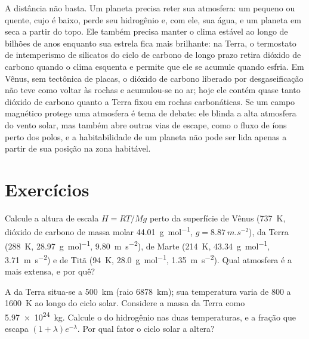 A distância não basta. Um planeta precisa reter sua atmosfera: um pequeno
ou quente, cujo  é baixo, perde seu hidrogênio e, com ele,
sua água, e um planeta em  seca a partir do topo.
Ele também precisa manter o clima estável ao longo de bilhões de anos enquanto sua estrela
fica mais brilhante: na Terra, o termostato de intemperismo de silicatos do
ciclo de carbono de longo prazo retira dióxido de carbono quando o clima esquenta
e permite que ele se acumule quando esfria. Em Vênus, sem tectônica de placas,
o dióxido de carbono liberado por desgaseificação não teve como voltar às rochas e
acumulou-se no ar; hoje ele contém quase tanto dióxido de carbono quanto a
Terra fixou em rochas carbonáticas. Se um campo magnético protege uma
atmosfera é tema de debate: ele blinda a alta atmosfera do vento
solar, mas também abre outras vias de escape, como o fluxo de íons
perto dos polos, e a habitabilidade de um planeta não pode ser lida apenas a partir de
sua posição na zona habitável.

\section{Exercícios}

\begin{exercise}[$\star$]\label{exo:b3:planetary-atmospheres:1}
Calcule a altura de escala $H = RT/Mg$ perto da superfície de Vênus
(\qty{737}{K}, dióxido de carbono de massa molar \qty{44.01}{g.mol^{-1}},
$g = \qty{8.87}{m.s^{-2}}$), da Terra (\qty{288}{K},
\qty{28.97}{g.mol^{-1}}, \qty{9.80}{m.s^{-2}}), de Marte (\qty{214}{K},
\qty{43.34}{g.mol^{-1}}, \qty{3.71}{m.s^{-2}}) e de Titã (\qty{94}{K},
\qty{28.0}{g.mol^{-1}}, \qty{1.35}{m.s^{-2}}). Qual atmosfera é a
mais extensa, e por quê?
\end{exercise}

\begin{exercise}[$\star$]\label{exo:b3:planetary-atmospheres:2}
A  da Terra situa-se a \qty{500}{km} (raio \qty{6878}{km}); sua
temperatura varia de 800 a \qty{1600}{K} ao longo do ciclo solar. Considere
a massa da Terra como \qty{5.97e24}{kg}. Calcule o 
do hidrogênio nas duas temperaturas, e a fração que escapa
$(1 + \lambda)e^{-\lambda}$. Por qual fator o ciclo solar a altera?
\end{exercise}

